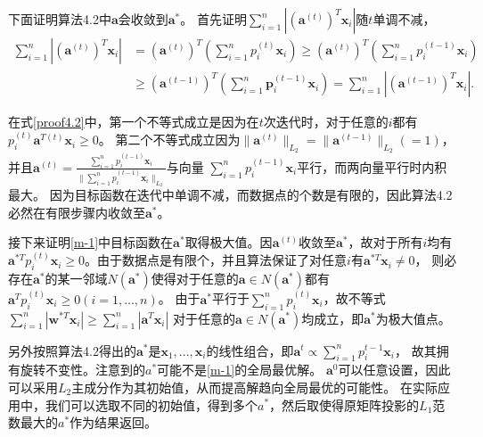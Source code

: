 下面证明算法4.2中$\bm a$会收敛到$\bm a^*$。
首先证明$\sum_{i=1}^n |{(\bm a^{(t)})}^T\bm x_i|$随$t$单调不减，
\begin{equation}
\begin{split}
     \sum_{i=1}^n |{(\bm a^{(t)})}^T \bm x_i| &= {(\bm a^{(t)})}^T (\sum_{i=1}^n p_i^{(t)}\bm x_i) 
     \geq {(\bm a^{(t)})}^T(\sum_{i=1}^n p_i^{(t-1)}\bm x_i)\\
     &\geq {(\bm a^{(t-1)})}^T(\sum_{i=1}^n\bm p_i^{(t-1)} \bm x_i) = \sum_{i=1}^n |{(\bm a^{(t-1)})}^T\bm x_i|.
\end{split}
\label{proof4.2}
\end{equation}

在式\eqref{proof4.2}中，第一个不等式成立是因为在$t$次迭代时，对于任意的$i$都有$p_i^{(t)}\bm a^{T(t)}\bm x_i \geq 0$。
第二个不等式成立因为$\| \bm a^{(t)}\|_{L_2} = \| \bm a^{(t-1)}\|_{L_2} (= 1)$，并且$\bm a^{(t)} = 
\frac{\sum_{i=1}^n p_i^{(t-1)}\bm x_i}{\| \sum_{i=1}^n p_i^{(t-1)}\bm x_i\|_{L_2}}$与向量
$\sum_{i=1}^n p_i^{(t-1)}\bm x_i$平行，而两向量平行时内积最大。
因为目标函数在迭代中单调不减，而数据点的个数是有限的，因此算法4.2必然在有限步骤内收敛至$\bm a^*$。

接下来证明\eqref{m-1}中目标函数在$\bm a^*$取得极大值。因$\bm a^{(t)}$收敛至$\bm a^*$，故对于所有$i$均有
$\bm a^{*T} p_i^{(t)} \bm x_i \geq 0$。由于数据点是有限个，并且算法保证了对任意$i$有$\bm a^{*T}\bm x_i \neq 0$，
则必存在$\bm a^*$的某一邻域$N(\bm a^*)$使得对于任意的$\bm a \in N(\bm a^*)$都有$\bm a^Tp_i^{(t)}\bm x_i \geq 0(i = 1, ..., n)$。
由于$\bm a^*$平行于$\sum_{i=1}^n p_i^{(t)}\bm x_i$，故不等式$\sum_{i=1}^n |\bm w^{*T} \bm x_i| \geq \sum_{i=1}^n |\bm a^T\bm x_i|$
对于任意的$\bm a \in N(\bm a^*)$均成立，即$\bm a^*$为极大值点。

另外按照算法4.2得出的$\bm a^*$是$\bm x_1, ..., \bm x_i$的线性组合，即$\bm a^t \propto \sum_{i=1}^np_i^{t-1}\bm x_i$，
故其拥有旋转不变性。注意到的$a^*$可能不是\eqref{m-1}的全局最优解。
$\bm a^0$可以任意设置，因此可以采用$L_2$主成分作为其初始值，从而提高解趋向全局最优的可能性。
在实际应用中，我们可以选取不同的初始值，得到多个$a^*$，然后取使得原矩阵投影的$L_1$范数最大的$a^*$作为结果返回。

